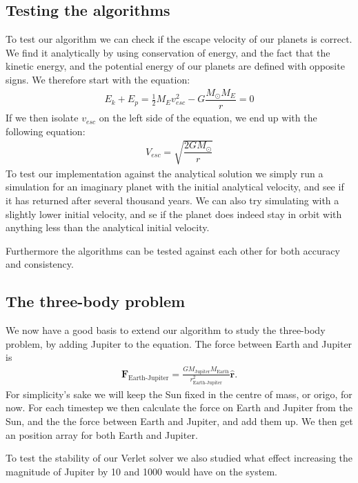 \documentclass[a4paper]{article}
\begin{document}
	\subsection{Testing the algorithms}
	To test our algorithm we can check if the escape velocity of our planets is correct. We find it analytically by using conservation of energy, and the fact that the kinetic energy, and the potential energy of our planets are defined with opposite signs. We therefore start with the equation:
	\begin{align*}
	E_k + E_p = \tfrac{1}{2}M_{E}v_{esc}^{2} - G\dfrac{M_{\odot}M_{E}}{r} = 0
	\end{align*}
	If we then isolate $v_{esc}$ on the left side of the equation, we end up with the following equation: 
	\begin{align}
	V_{esc} = \sqrt{\dfrac{2GM_{\odot}}{r}}
	\end{align}
	To test our implementation against the analytical solution we simply run a simulation for an imaginary planet with the initial analytical velocity, and see if it has returned after several thousand years. We can also try simulating with a slightly lower initial velocity, and se if the planet does indeed stay in orbit with anything less than the analytical initial velocity.
	
	Furthermore the algorithms can be tested against each other for both accuracy and consistency.
	
	
	\subsection{The three-body problem}
	We now have a good basis to extend our algorithm to study the three-body problem, by adding Jupiter to the equation. The force between Earth and Jupiter is
	\begin{align}
	\boldsymbol{F}_{\text{Earth-Jupiter}} = \frac{G M_\text{Jupiter} M_{\text{Earth}}} {r_{\text{Earth-Jupiter}}^{2}} \boldsymbol{\hat{r}}.
	\end{align}
	For simplicity's sake we will keep the Sun fixed in the centre of mass, or origo, for now. For each timestep we then calculate the force on Earth and Jupiter from the Sun, and the the force between Earth and Jupiter, and add them up. We then get an position array for both Earth and Jupiter.
	
	To test the stability of our Verlet solver we also studied what effect increasing the magnitude of Jupiter by 10 and 1000 would have on the system.
	
\end{document}
